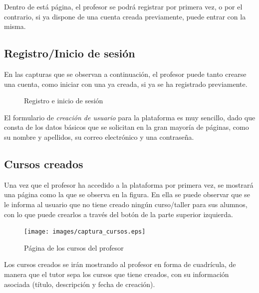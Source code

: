 Dentro de está página, el profesor se podrá registrar por primera vez, o por el contrario, si ya dispone de una cuenta creada previamente, puede entrar con la misma.


\newpage
\subsection{Registro/Inicio de sesión}
\label{1:sec:2}

En las capturas que se observan a continuación, el profesor puede tanto crearse una cuenta, como iniciar con una ya creada, si ya se ha registrado previamente. 
\begin{figure}[!th]%
    \centering
    \qquad
    \caption{Registro e inicio de sesión}%
    \label{fig:12}%
\end{figure}

El formulario de \textit{creación de usuario} para la plataforma es muy sencillo, dado que consta de los datos básicos que se solicitan en la gran mayoría de páginas, como su nombre y apellidos, su correo electrónico y una contraseña.


\subsection{Cursos creados}
\label{1:sec:3}

Una vez que el profesor ha accedido a la plataforma por primera vez, se mostrará una página como la que se observa en la figura. En ella se puede observar que se le informa al usuario que no tiene creado ningún curso/taller para sus alumnos, 
con lo que puede crearlos a través del botón de la parte superior izquierda.

\newpage
\begin{figure}[!th]
\begin{center}
\texttt{[image: images/captura\_cursos.eps]}
\caption{Página de los cursos del profesor}
\label{fig:13}
\end{center}
\end{figure}

Los cursos creados se irán mostrando al profesor en forma de cuadrícula, de manera que el tutor sepa los cursos que tiene creados, con su información asociada (título, descripción y fecha de creación).

